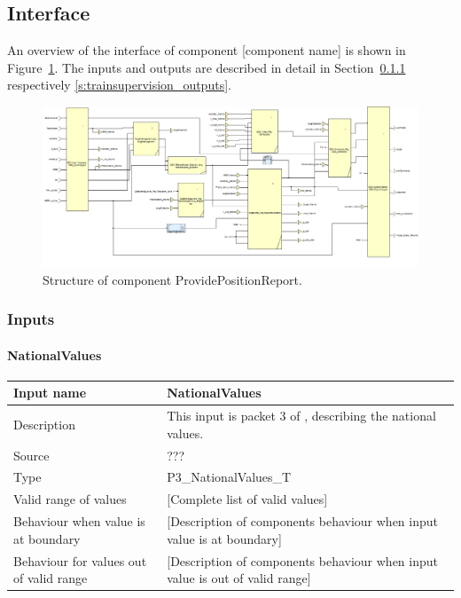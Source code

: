 \subsection{Interface}

An overview of the interface of component [component name] is shown in Figure~\ref{f:ssv}. The inputs and outputs are described in detail in Section~\ref{s:trainsupervision_inputs} respectively \ref{s:trainsupervision_outputs}.

\begin{figure}
\centering
\includegraphics[width=0.95\textheight, angle=90]{../images/speedsupervision.png}
\caption{Structure of component ProvidePositionReport.}\label{f:ssv}
\end{figure}



\subsubsection{Inputs}\label{s:trainsupervision_inputs}

\paragraph{NationalValues}

\begin{longtable}{p{}p{}}
\toprule
Input name				& NationalValues \\
\midrule
Description				& This input is packet 3 of \cite[Chapt.~8]{subset-026}, describing the national values.  \\
\midrule
Source					& ??? \\ 
\midrule
Type					& P3\_NationalValues\_T \\
\midrule
Valid range of values	& [Complete list of valid values] \\
\midrule
Behaviour when value is at boundary	& [Description of components behaviour when input value is at boundary] \\
\midrule
Behaviour for values out of valid range	& [Description of components behaviour when input value is out of valid range] \\
\bottomrule
\end{longtable}


